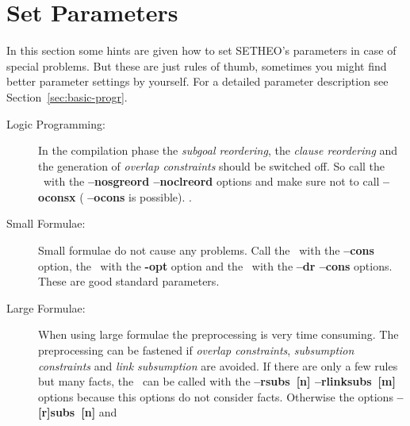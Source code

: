 %

\section{Set Parameters}

In this section some hints are given how to set SETHEO's parameters in
case of special problems. But these are just rules of thumb, sometimes
you might find better parameter settings by yourself. For a detailed
parameter description see Section~\ref{sec:basic-progr}.

\begin{description}
\item[Logic Programming:]
     {In the compilation phase the {\it subgoal reordering\/},
      the {\it clause reordering\/} and the generation of {\it
      overlap constraints\/} should be switched off. 
      So call the \inw\ with the {\bf --nosgreord --noclreord}
      options and make sure not to call {\bf --oconsx} ({\bf
      --ocons} is possible). 
      }.
\item[Small Formulae:]
     {Small formulae do not cause any problems. Call the \inw\ with
      the {\bf --cons} option, the \wasm\ with the {\bf -opt}
      option and the \sam\ with the {\bf --dr --cons} options. These
      are good standard parameters.} 
\item[Large Formulae:]
     {When using large formulae the preprocessing is very time
      consuming. The 
      preprocessing can be fastened if {\it overlap constraints\/},
      {\it subsumption constraints\/} and {\it link subsumption\/} are
      avoided. If there are only a few rules but many facts, the \inw\
      can be called with the {\bf --rsubs~[n] --rlinksubs~[m]}
      options because this options do not consider facts. Otherwise
      the options {\bf --[r]subs~[n]} and {\bf 
}}
\end{description}
